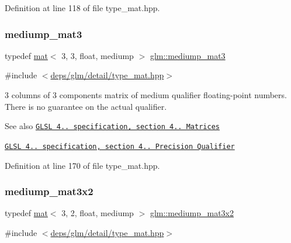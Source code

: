 Definition at line 118 of file type\+\_\+mat.\+hpp.

\mbox{\label{group__core__precision_ga718616ee458f17e2525641b94975c184}} 
\subsubsection{\texorpdfstring{mediump\+\_\+mat3}{mediump\_mat3}}
{\footnotesize\ttfamily typedef \hyperlink{structglm_1_1mat}{mat}$<$ 3, 3, float, mediump $>$ \hyperlink{group__core__precision_ga718616ee458f17e2525641b94975c184}{glm\+::mediump\+\_\+mat3}}



{\ttfamily \#include $<$\hyperlink{type__mat_8hpp}{deps/glm/detail/type\+\_\+mat.\+hpp}$>$}

3 columns of 3 components matrix of medium qualifier floating-\/point numbers. There is no guarantee on the actual qualifier.

\begin{DoxySeeAlso}{See also}
\href{http://www.opengl.org/registry/doc/GLSLangSpec.4.20.8.pdf}{\tt G\+L\+SL 4.. specification, section 4.. Matrices} 

\href{http://www.opengl.org/registry/doc/GLSLangSpec.4.20.8.pdf}{\tt G\+L\+SL 4.. specification, section 4.. Precision Qualifier} 
\end{DoxySeeAlso}


Definition at line 170 of file type\+\_\+mat.\+hpp.

\mbox{\label{group__core__precision_ga1215c51719dd5e01efb27ff525e431fb}} 
\subsubsection{\texorpdfstring{mediump\+\_\+mat3x2}{mediump\_mat3x2}}
{\footnotesize\ttfamily typedef \hyperlink{structglm_1_1mat}{mat}$<$ 3, 2, float, mediump $>$ \hyperlink{group__core__precision_ga1215c51719dd5e01efb27ff525e431fb}{glm\+::mediump\+\_\+mat3x2}}



{\ttfamily \#include $<$\hyperlink{type__mat_8hpp}{deps/glm/detail/type\+\_\+mat.\+hpp}$>$}

